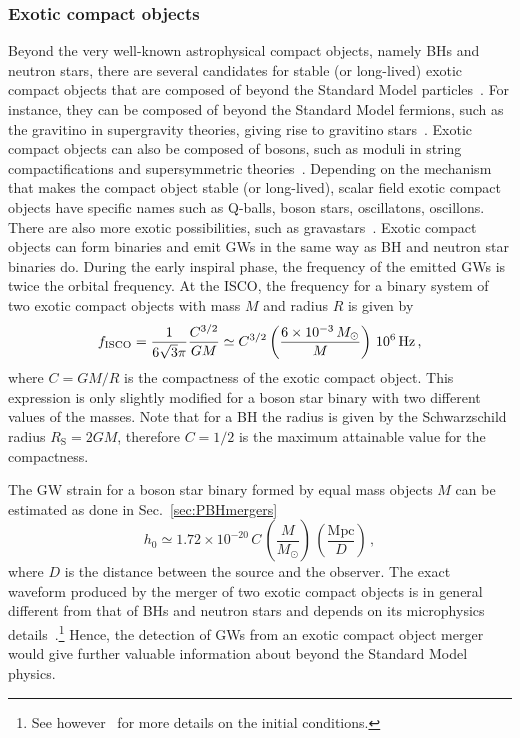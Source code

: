 \documentclass[11pt,a4paper]{article}
\begin{document}
\subsubsection{Exotic compact objects }
\label{sec:ECOs}
Beyond the very well-known astrophysical compact objects, namely BHs and neutron stars, there are several candidates for stable (or long-lived) exotic compact objects that are composed of beyond the Standard Model particles~\cite{Giudice_2016}. For instance, they can be composed of beyond the Standard Model fermions, such as the gravitino in supergravity theories, giving rise to gravitino stars~\cite{Narain_2006}. Exotic compact objects can also be composed of bosons, such as moduli in string compactifications and supersymmetric theories~\cite{Krippendorf_2018}. Depending on the mechanism that makes the compact object stable (or long-lived), scalar field exotic compact objects have specific names such as Q-balls, boson stars, oscillatons, oscillons. There are also more exotic possibilities, such as gravastars~\cite{mazur2001gravitational}. Exotic compact objects can form binaries and emit GWs in the same way as BH and neutron star binaries do. During the early inspiral phase, the frequency of the emitted GWs is twice the orbital frequency. At the ISCO, the frequency for a binary system of two exotic compact objects with mass $M$ and radius $R$ is given by~\cite{Giudice_2016}
\begin{equation}
f_{\rm ISCO} = \frac{1}{6 \sqrt{3} \pi} \frac{C^{3/2}}{G M} \simeq C^{3/2} \left(\frac{6 \times 10^{-3} \, M_\odot}{M}\right) \, 10^6 \, \text{Hz} \,,
\label{eq:fISCO-ECO}
\end{equation}
where $C = G M/R$ is the compactness of the exotic compact object. This expression is only slightly modified for a boson star binary with two different values of the masses. Note that for a BH the radius is given by the Schwarzschild radius $R_{\text{S}} = 2 G M$, therefore $C = 1/2$ is the maximum attainable value for the compactness.

The GW strain for a boson star binary formed by equal mass objects $M$ can be estimated as done in Sec.~\ref{sec:PBHmergers}
\begin{equation}
h_0 \simeq 1.72 \times 10^{-20}\, C \, \left(\frac{M}{M_\odot}\right) \, \left(\frac{\text{Mpc}}{D}\right) \,,
\label{eq:h0-ECO}
\end{equation}
where $D$ is the distance between the source and the observer. The exact waveform produced by the merger of two exotic compact objects is in general different from that of BHs and neutron stars and depends on its microphysics details~\cite{Giudice_2016, Palenzuela_2017}.\footnote{See however~\cite{Helfer:2018vtq} for more details on the initial conditions.} Hence, the detection of GWs from an exotic compact object merger would give further valuable information about beyond the Standard Model physics.
\end{document}
